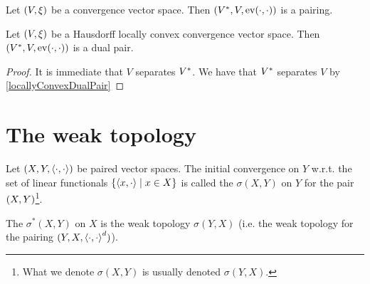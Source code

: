 \begin{example}
Let $\sSet{V, \xi}$ be a convergence vector space. Then $\sSet{\dual{V}, V, \evalMap(\cdot,\cdot)}$ is a pairing.
\end{example}

\begin{proposition} \label{HausdorffLCTVSdualSystem}
Let $\sSet{V,\xi}$ be a Hausdorff locally convex convergence vector space. Then $\sSet{\dual{V}, V, \evalMap(\cdot,\cdot)}$ is a dual pair.
\end{proposition}
\begin{proof}
It is immediate that $V$ separates ${V}^*$. We have that ${V}^*$ separates $V$ by \ref{locallyConvexDualPair}
\end{proof}

\section{The weak topology}
\begin{definition}
Let $(X,Y,\left\langle \cdot,\cdot \right\rangle)$ be paired vector spaces. 
The initial convergence on $Y$ w.r.t. the set of linear functionals $\setbuilder{\pair{x,\cdot}}{x\in X}$ is called the  $\sigma(X,Y)$ on $Y$ for the pair $\sSet{X,Y}$\footnote{What we denote $\sigma(X,Y)$ is usually denoted $\sigma(Y,X)$.}.

The  $\sigma^*(X,Y)$ on $X$ is the weak topology $\sigma(Y,X)$ (i.e. the weak topology for the pairing $(Y,X,\left\langle \cdot,\cdot \right\rangle^d)$).
\end{definition}

